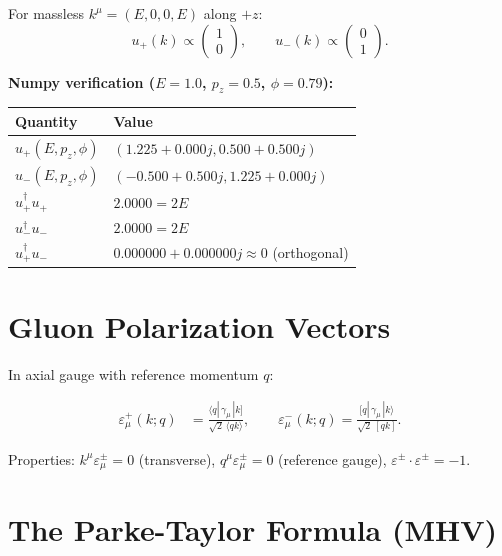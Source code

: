 \documentclass[12pt]{article}
\begin{document}
For massless $k^\mu=(E,0,0,E)$ along $+z$:
\begin{equation}
u_+(k)\propto\begin{pmatrix}1\\0\end{pmatrix},
\qquad
u_-(k)\propto\begin{pmatrix}0\\1\end{pmatrix} .
\end{equation}

\textbf{Numpy verification ($E=1.0$, $p_z=0.5$, $\phi=0.79$):}
\begin{center}
\begin{tabular}{|l|l|}
\hline
Quantity & Value \\
\hline
$u_+(E,p_z,\phi)$ & $(1.225+0.000j, 0.500+0.500j)$ \\
$u_-(E,p_z,\phi)$ & $(-0.500+0.500j, 1.225+0.000j)$ \\
$u_+^\dagger u_+$ & $2.0000 = 2E$ \\
$u_-^\dagger u_-$ & $2.0000 = 2E$ \\
$u_+^\dagger u_-$ & $0.000000+0.000000j \approx 0$ (orthogonal) \\
\hline
\end{tabular}
\end{center}

\section{Gluon Polarization Vectors}\label{sec:polarization}

In axial gauge with reference momentum $q$:

\begin{mdframed}
\begin{align}
\varepsilon^+_\mu(k;q)
&= \frac{\langle q|\,\gamma_\mu\,|k]}{\sqrt2\,\langle qk\rangle},
\qquad
\varepsilon^-_\mu(k;q)
= \frac{[q|\,\gamma_\mu\,|k\rangle}{\sqrt2\,[qk]} .
\tag{50.$\star$}
\end{align}
\end{mdframed}

Properties: $k^\mu\varepsilon_\mu^\pm=0$ (transverse),
$q^\mu\varepsilon_\mu^\pm=0$ (reference gauge),
$\varepsilon^\pm\cdot\varepsilon^\pm=-1$.

\section{The Parke-Taylor Formula (MHV)}\label{sec:mhv}
\end{document}
